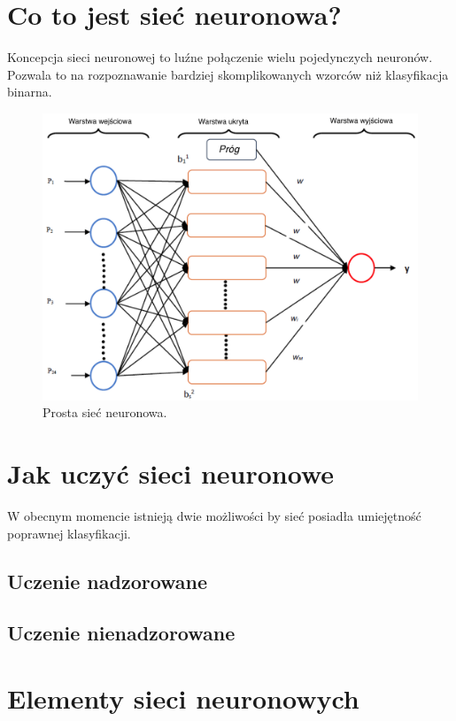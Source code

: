 \documentclass[12pt,a4paper,twoside,titlepage,openright]{book}
\begin{document}
\section{Co to jest sieć neuronowa?}
Koncepcja sieci neuronowej to luźne połączenie wielu pojedynczych neuronów. Pozwala to na rozpoznawanie bardziej skomplikowanych wzorców niż klasyfikacja binarna. 

\begin{figure}[h]
	\centering
			\includegraphics[resolution=120]{SiecNeuronowa.png}
		\caption{Prosta sieć neuronowa.}
\end{figure}

\section{Jak uczyć sieci neuronowe}
W obecnym momencie istnieją dwie możliwości by sieć posiadła umiejętność poprawnej klasyfikacji. 

\subsection*{Uczenie nadzorowane}
\subsection*{Uczenie nienadzorowane}


\section{Elementy sieci neuronowych}
\end{document}
